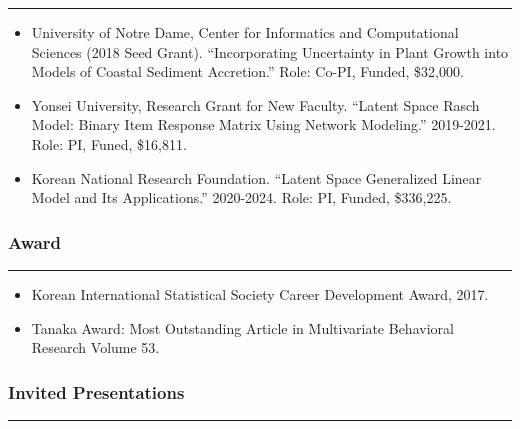 \documentclass[]{book}
\providecommand{\tightlist}{%
  \setlength{\itemsep}{0pt}\setlength{\parskip}{0pt}}
\begin{document}
\begin{center}\rule{0.5\linewidth}{0.5pt}\end{center}

\begin{itemize}
\item
  University of Notre Dame, Center for Informatics and Computational Sciences (2018 Seed Grant). ``Incorporating Uncertainty in Plant Growth into Models of Coastal Sediment Accretion.'' Role: Co-PI, Funded, \$32,000.
\item
  Yonsei University, Research Grant for New Faculty. ``Latent Space Rasch Model: Binary Item Response Matrix Using Network Modeling.'' 2019-2021. Role: PI, Funed, \$16,811.
\item
  Korean National Research Foundation. ``Latent Space Generalized Linear Model and Its Applications.'' 2020-2024. Role: PI, Funded, \$336,225.
\end{itemize}

\hypertarget{award}{%
\subsubsection*{Award}\label{award}}

\begin{center}\rule{0.5\linewidth}{0.5pt}\end{center}

\begin{itemize}
\tightlist
\item
  Korean International Statistical Society Career Development Award, 2017.
\item
  Tanaka Award: Most Outstanding Article in Multivariate Behavioral Research Volume 53.
\end{itemize}

\hypertarget{invited-presentations}{%
\subsubsection*{Invited Presentations}\label{invited-presentations}}

\begin{center}\rule{0.5\linewidth}{0.5pt}\end{center}
\end{document}
